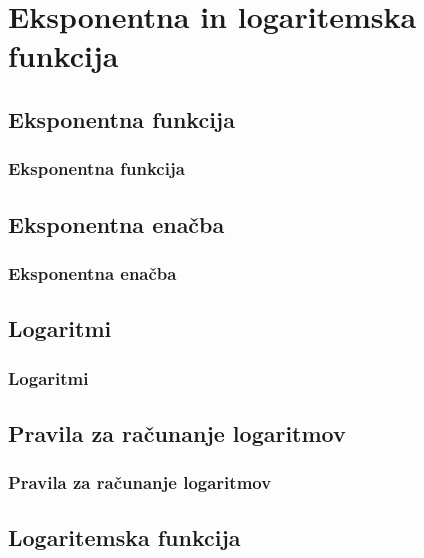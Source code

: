 \section{Eksponentna in logaritemska funkcija}

\begin{frame}
    \sectionpage
\end{frame}

\begin{frame}
\end{frame}

    \subsection{Eksponentna funkcija}

        \begin{frame}
            \frametitle{Eksponentna funkcija}
        \end{frame}

    \subsection{Eksponentna enačba}

        \begin{frame}
            \frametitle{Eksponentna enačba}
        \end{frame}

    \subsection{Logaritmi}

        \begin{frame}
            \frametitle{Logaritmi}
        \end{frame}

    \subsection{Pravila za računanje logaritmov}

        \begin{frame}
            \frametitle{Pravila za računanje logaritmov}
        \end{frame}

    \subsection{Logaritemska funkcija}

